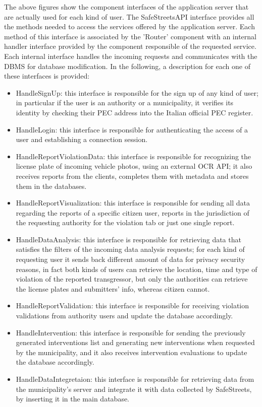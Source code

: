 The above figures show the component interfaces of the application server that are actually used for each kind of user. The SafeStreetsAPI interface provides all the methods needed to access the services offered by the application server. Each method of this interface is associated by the 'Router' component with an internal handler interface provided by the component responsible of the requested service. Each internal interface handles the incoming requests and communicates with the DBMS for database modification. In the following, a description for each one of these interfaces is provided:
\begin{itemize}
	\item HandleSignUp: this interface is responsible for the sign up of any kind of user; in particular if the user is an authority or a municipality, it verifies its identity by checking their PEC address into the Italian official PEC register.
	\item HandleLogin: this interface is responsible for authenticating the access of a user and establishing a connection session.
	\item HandleReportViolationData: this interface is responsible for recognizing the license plate of incoming vehicle photos, using an external OCR API; it also receives reports from the clients, completes them with metadata and stores them in the databases.
	\item HandleReportVisualization: this interface is responsible for sending all data regarding the reports of a specific citizen user, reports in the jurisdiction of the requesting authority for the violation tab or just one single report.
	\item HandleDataAnalysis: this interface is responsible for retrieving data that satisfies the filters of the incoming data analysis requests; for each kind of requesting user it sends back different amount of data for privacy security reasons, in fact both kinds of users can retrieve the location, time and type of violation of the reported transgressor, but only the authorities can retrieve the license plates and submitters' info, whereas citizen cannot.
	\item HandleReportValidation: this interface is responsible for receiving violation validations from authority users and update the database accordingly.
	\item HandleIntervention: this interface is responsible for sending the previously generated interventions list and generating new interventions when requested by the municipality, and it also receives intervention evaluations to update the database accordingly.
	\item HandleDataIntegretaion: this interface is responsible for retrieving data from the municipality's server and integrate it with data collected by SafeStreets, by inserting it in the main database.
\end{itemize}